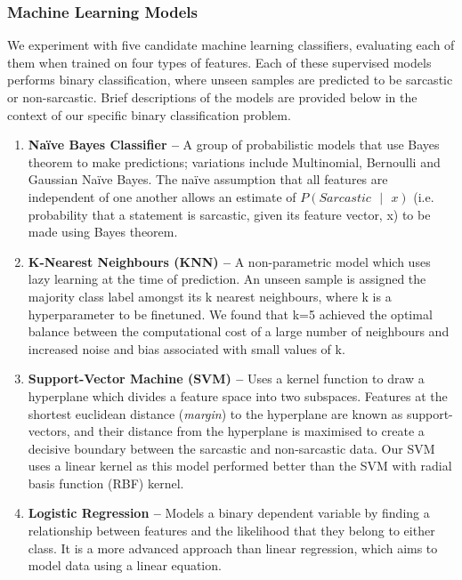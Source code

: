 \documentclass[12pt,a4paper]{article}
\begin{document}
\subsubsection{Machine Learning Models}
We experiment with five candidate machine learning classifiers, evaluating each of them when trained on four types of features. Each of these supervised models performs binary classification, where unseen samples are predicted to be sarcastic or non-sarcastic. Brief descriptions of the models are provided below in the context of our specific binary classification problem. \vspace{-3pt}

\begin{enumerate}
	\item \textbf{Na\"{i}ve Bayes Classifier --} A group of probabilistic models that use Bayes theorem to make predictions; variations include Multinomial, Bernoulli and Gaussian Na\"{i}ve Bayes. The na\"{i}ve assumption that all features are independent of one another allows an estimate of ${P(Sarcastic \text{ }| \text{ }x)}$ (i.e. probability that a statement is sarcastic, given its feature vector, x) to be made using Bayes theorem.\vspace{-3pt}
	
	\item \textbf{K-Nearest Neighbours (KNN) --} A non-parametric model which uses lazy learning at the time of prediction. An unseen sample is assigned the majority class label amongst its k nearest neighbours, where k is a hyperparameter to be finetuned. We found that k=5 achieved the optimal balance between the computational cost of a large number of neighbours and increased noise and bias associated with small values of k.\vspace{-3pt}
	
	\item \textbf{Support-Vector Machine (SVM) --} Uses a kernel function to draw a hyperplane which divides a feature space into two subspaces. Features at the shortest euclidean distance (\textit{margin}) to the hyperplane are known as support-vectors, and their distance from the hyperplane is maximised to create a decisive boundary between the sarcastic and non-sarcastic data. Our SVM uses a linear kernel as this model performed better than the SVM with radial basis function (RBF) kernel.\vspace{-3pt}

	\item \textbf{Logistic Regression --} Models a binary dependent variable by finding a relationship between features and the likelihood that they belong to either class. It is a more advanced approach than linear regression, which aims to model data using a linear equation.\vspace{-3pt}


\end{enumerate}
\end{document}
